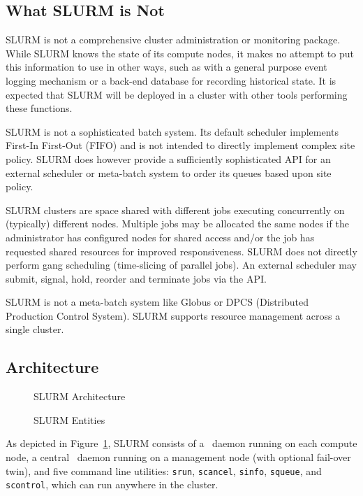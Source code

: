 \subsection{What SLURM is Not}

SLURM is not a comprehensive cluster administration or monitoring package.  
While SLURM knows the state of its compute nodes, it makes no attempt to put
this information to use in other ways, such as with a general purpose event
logging mechanism or a back-end database for recording historical state.
It is expected that SLURM will be deployed in a cluster with other 
tools performing these functions. 

SLURM is not a sophisticated batch system.  Its default scheduler
implements First-In First-Out (FIFO) and is not 
intended to directly implement complex site policy.
SLURM does however provide a sufficiently sophisticated API for an external 
scheduler or meta-batch system to order its queues based upon site policy.

SLURM clusters are space shared with different jobs executing 
concurrently on (typically) different nodes. 
Multiple jobs may be allocated the same nodes 
if the administrator has configured nodes for shared access and/or 
the job has requested shared resources for improved responsiveness.
SLURM does not directly perform gang scheduling (time-slicing 
of parallel jobs). An external scheduler may submit, signal, hold, 
reorder and terminate jobs via the API.

SLURM is not a meta-batch system like Globus\cite{Globus2002}
or DPCS (Distributed Production Control System)\cite{DPCS2002}.  
SLURM supports resource management across a single cluster.

\subsection{Architecture}

\begin{figure}[tb]
\centerline{}
\caption{SLURM Architecture}
\label{arch}
\end{figure}

\begin{figure}[tcb]
\centerline{}
\caption{SLURM Entities}
\label{entities}
\end{figure}

As depicted in Figure~\ref{arch}, SLURM consists of a \slurmd\ daemon
running on each compute node, a central \slurmctld\ daemon running on
a management node (with optional fail-over twin), and five command line
utilities: {\tt srun}, {\tt scancel}, {\tt sinfo}, {\tt squeue}, and 
{\tt scontrol}, which can run anywhere in the cluster.  

